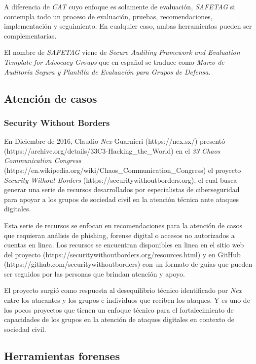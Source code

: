 \documentclass[12pt]{caltech_thesis}
\begin{document}
A diferencia de \textit{CAT} cuyo enfoque es solamente de evaluación, \textit{SAFETAG} si contempla todo un proceso de evaluación, pruebas, recomendaciones, implementación y seguimiento.  En cualquier caso, ambas herramientas pueden ser complementarias.

El nombre de \textit{SAFETAG} viene de \textit{Secure Auditing Framework and Evaluation Template for Advocacy Groups} que en español se traduce como \textit{Marco de Auditoría Segura y Plantilla de Evaluación para Grupos de Defensa}. 

\subsection{Atención de casos}

\subsubsection{Security Without Borders}

En Diciembre de 2016, Claudio \textit{Nex} Guarnieri (https://nex.sx/) presentó (https://archive.org/details/33C3-Hacking\_the\_World) en el \textit{33 Chaos Communication Congress} (https://en.wikipedia.org/wiki/Chaos\_Communication\_Congress) el proyecto \textit{Security Without Borders} (https://securitywithoutborders.org), el cual busca generar una serie de recursos desarrollados por especialistas de ciberseguridad para apoyar a los grupos de sociedad civil en la atención técnica ante ataques digitales.

Esta serie de recursos se enfocan en recomendaciones para la atención de casos que requieran análisis de phishing, forense digital o accesos no autorizados a cuentas en linea. Los recursos se encuentran disponibles en linea en el sitio web del proyecto (https://securitywithoutborders.org/resources.html) y en GitHub (https://github.com/securitywithoutborders) con un formato de guías que pueden ser seguidos por las personas que brindan atención y apoyo.

El proyecto surgió como respuesta al desequilibrio técnico identificado por \textit{Nex} entre los atacantes y los grupos e individuos que reciben los ataques. Y es uno de los pocos proyectos que tienen un enfoque técnico para el fortalecimiento de capacidades de los grupos en la atención de ataques digitales en contexto de sociedad civil.

\subsection{Herramientas forenses}
\end{document}
